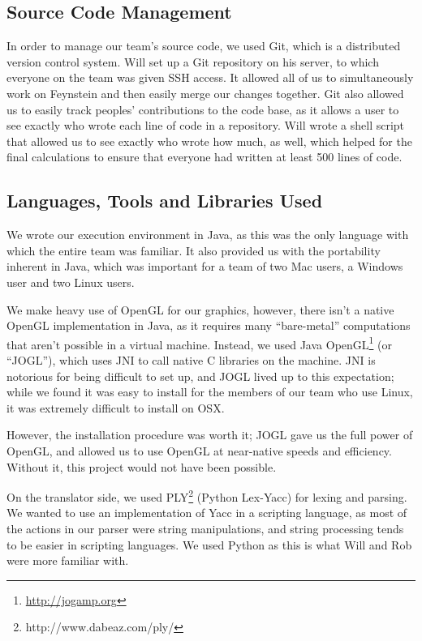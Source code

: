 \subsection{Source Code Management}

In order to manage our team's source code, we used Git, which is a
distributed version control system. Will set up a Git repository on
his server, to which everyone on the team was given SSH access. It
allowed all of us to simultaneously work on Feynstein and then easily
merge our changes together. Git also allowed us to easily track
peoples' contributions to the code base, as it allows a user to see
exactly who wrote each line of code in a repository. Will wrote a
shell script that allowed us to see exactly who wrote how much, as
well, which helped for the final calculations to ensure that everyone
had written at least 500 lines of code.

\subsection{Languages, Tools and Libraries Used}

We wrote our execution environment in Java, as this was the only
language with which the entire team was familiar. It also provided us
with the portability inherent in Java, which was important for a team
of two Mac users, a Windows user and two Linux users.

We make heavy use of OpenGL for our graphics, however, there isn't a
native OpenGL implementation in Java, as it requires many
``bare-metal'' computations that aren't possible in a virtual
machine. Instead, we used Java OpenGL\footnote{
 \url{http://jogamp.org}} (or ``JOGL''), which uses JNI to call native
C libraries on the machine. JNI is notorious for being difficult to
set up, and JOGL lived up to this expectation; while we found it was
easy to install for the members of our team who use Linux, it was
extremely difficult to install on OSX. 

However, the installation procedure was worth it; JOGL gave us the
full power of OpenGL, and allowed us to use OpenGL at near-native
speeds and efficiency. Without it, this project would not have been
possible.

On the translator side, we used
PLY\footnote{http://www.dabeaz.com/ply/} (Python Lex-Yacc) for lexing
and parsing. We wanted to use an implementation of Yacc in a scripting
language, as most of the actions in our parser were string
manipulations, and string processing tends to be easier in scripting
languages. We used Python as this is what Will and Rob were more
familiar with.